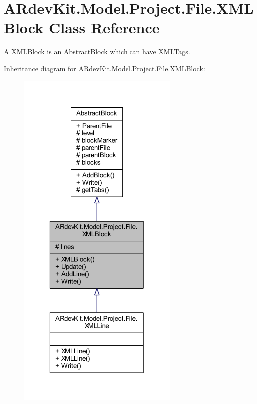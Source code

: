\hypertarget{class_a_rdev_kit_1_1_model_1_1_project_1_1_file_1_1_x_m_l_block}{\section{A\-Rdev\-Kit.\-Model.\-Project.\-File.\-X\-M\-L\-Block Class Reference}
\label{class_a_rdev_kit_1_1_model_1_1_project_1_1_file_1_1_x_m_l_block}
}


A \hyperlink{class_a_rdev_kit_1_1_model_1_1_project_1_1_file_1_1_x_m_l_block}{X\-M\-L\-Block} is an \hyperlink{class_a_rdev_kit_1_1_model_1_1_project_1_1_file_1_1_abstract_block}{Abstract\-Block} which can have \hyperlink{class_a_rdev_kit_1_1_model_1_1_project_1_1_file_1_1_x_m_l_tag}{X\-M\-L\-Tag}s.  




Inheritance diagram for A\-Rdev\-Kit.\-Model.\-Project.\-File.\-X\-M\-L\-Block\-:
\nopagebreak
\begin{figure}[H]
\begin{center}
\leavevmode
\includegraphics[width=220pt]{class_a_rdev_kit_1_1_model_1_1_project_1_1_file_1_1_x_m_l_block__inherit__graph}
\end{center}
\end{figure}


